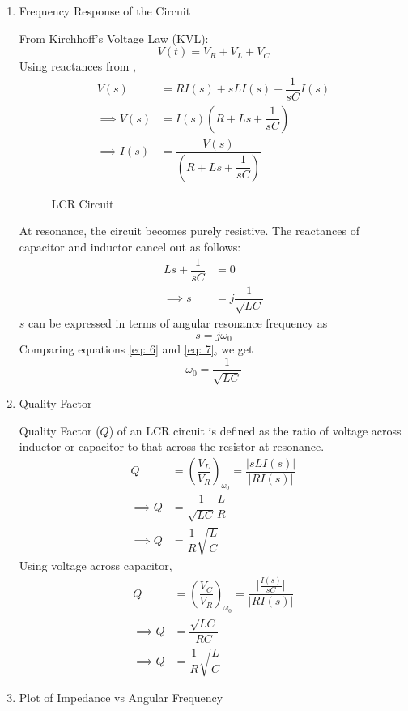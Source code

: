 \documentclass[journal,12pt,twocolumn]{IEEEtran}
\theoremstyle{remark}
\begin{document}
\begin{enumerate}
\item {Frequency Response of the Circuit}

From Kirchhoff's Voltage Law (KVL):
\begin{equation}
V(t) = V_R + V_L + V_C \label{eq:KVL}
\end{equation}
Using reactances from ,
\begin{align}
    V(s) &= R I(s) + sL I(s) + \dfrac{1}{sC} I(s)\\
    \implies V(s) &= I(s)\left(R + Ls + \dfrac{1}{sC}\right)\\
    \implies I(s) &= \dfrac{V(s)}{\left(R + Ls + \dfrac{1}{sC}\right)} \label{eq: 4}
\end{align}
\begin{figure}[!h]
 \centering
    
    \caption{LCR Circuit}
    \label{fig:2}
\end{figure}
At resonance, the circuit becomes purely resistive. The reactances of capacitor and inductor cancel out as follows:
\begin{align}
    Ls + \dfrac{1}{sC} &= 0\\
    \implies s &= j\dfrac{1}{\sqrt{LC}} \label{eq: 6}
\end{align}
$s$ can be expressed in terms of angular resonance frequency as
\begin{equation}
    s = j\omega_0 \label{eq: 7}
\end{equation}
Comparing equations \eqref{eq: 6} and \eqref{eq: 7}, we get
\begin{equation}
    \omega_0 = \dfrac{1}{\sqrt{LC}}
\end{equation}
\item{Quality Factor}

Quality Factor ($Q$) of an LCR circuit is defined as the ratio of voltage across inductor or capacitor to that across the resistor at resonance.
\begin{align}
    Q &= \left(\dfrac{V_L}{V_R}\right)_{\omega_0} = \dfrac{\lvert{sLI(s)}\rvert}{\lvert RI(s) \rvert}\\
    \implies Q &= \dfrac{1}{\sqrt{LC}}\dfrac{L}{R}\\
    \implies Q &= \dfrac{1}{R}\sqrt{\dfrac{L}{C}}
\end{align}
Using voltage across capacitor,
\begin{align}
    Q &= \left(\dfrac{V_C}{V_R}\right)_{\omega_0} = \dfrac{\lvert{\frac{I(s)}{sC}}\rvert}{\lvert RI(s) \rvert}\\
    \implies Q &= \dfrac{\sqrt{LC}}{RC}\\
    \implies Q &= \dfrac{1}{R}\sqrt{\dfrac{L}{C}}
\end{align}
\item{Plot of Impedance vs Angular Frequency}


\end{enumerate}
\end{document}
